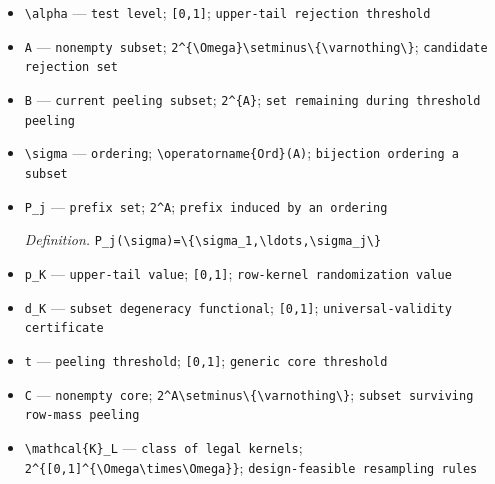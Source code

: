 \documentclass{article}
\begin{document}
\begin{itemize}
  \item \texttt{\textbackslash{}\allowbreak{}alpha} --- \texttt{test level}; \texttt{[0,\allowbreak{}1]}; \texttt{upper-\allowbreak{}tail rejection threshold}
  \item \texttt{A} --- \texttt{nonempty subset}; \texttt{2\textasciicircum{}\{\textbackslash{}\allowbreak{}Omega\}\allowbreak{}\textbackslash{}\allowbreak{}setminus\textbackslash{}\allowbreak{}\{\textbackslash{}\allowbreak{}varnothing\textbackslash{}\allowbreak{}\}\allowbreak{}}; \texttt{candidate rejection set}
  \item \texttt{B} --- \texttt{current peeling subset}; \texttt{2\textasciicircum{}\{A\}\allowbreak{}}; \texttt{set remaining during threshold peeling}
  \item \texttt{\textbackslash{}\allowbreak{}sigma} --- \texttt{ordering}; \texttt{\textbackslash{}\allowbreak{}operatorname\{Ord\}\allowbreak{}(A)}; \texttt{bijection ordering a subset}
  \item \texttt{P\_\allowbreak{}j} --- \texttt{prefix set}; \texttt{2\textasciicircum{}A}; \texttt{prefix induced by an ordering}
  \par\smallskip\noindent\emph{Definition.} \texttt{P\_\allowbreak{}j(\textbackslash{}\allowbreak{}sigma)=\allowbreak{}\textbackslash{}\allowbreak{}\{\textbackslash{}\allowbreak{}sigma\_\allowbreak{}1,\allowbreak{}\textbackslash{}\allowbreak{}ldots,\allowbreak{}\textbackslash{}\allowbreak{}sigma\_\allowbreak{}j\textbackslash{}\allowbreak{}\}\allowbreak{}}
  \item \texttt{p\_\allowbreak{}K} --- \texttt{upper-\allowbreak{}tail value}; \texttt{[0,\allowbreak{}1]}; \texttt{row-\allowbreak{}kernel randomization value}
  \item \texttt{d\_\allowbreak{}K} --- \texttt{subset degeneracy functional}; \texttt{[0,\allowbreak{}1]}; \texttt{universal-\allowbreak{}validity certificate}
  \item \texttt{t} --- \texttt{peeling threshold}; \texttt{[0,\allowbreak{}1]}; \texttt{generic core threshold}
  \item \texttt{C} --- \texttt{nonempty core}; \texttt{2\textasciicircum{}A\textbackslash{}\allowbreak{}setminus\textbackslash{}\allowbreak{}\{\textbackslash{}\allowbreak{}varnothing\textbackslash{}\allowbreak{}\}\allowbreak{}}; \texttt{subset surviving row-\allowbreak{}mass peeling}
  \item \texttt{\textbackslash{}\allowbreak{}mathcal\{K\}\allowbreak{}\_\allowbreak{}L} --- \texttt{class of legal kernels}; \texttt{2\textasciicircum{}\{[0,\allowbreak{}1]\textasciicircum{}\{\textbackslash{}\allowbreak{}Omega\textbackslash{}\allowbreak{}times\textbackslash{}\allowbreak{}Omega\}\allowbreak{}\}\allowbreak{}}; \texttt{design-\allowbreak{}feasible resampling rules}

\end{itemize}
\end{document}
